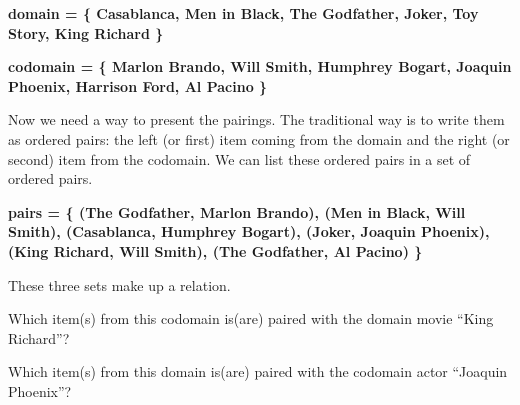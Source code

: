 \documentclass{ximera}
\begin{document}
\begin{center} 
\textbf{\textcolor{blue!75!black}{ domain = \{ Casablanca, Men in Black,  The Godfather, Joker, Toy Story, King Richard \} }}
\end{center}

\begin{center} 
\textbf{\textcolor{blue!75!black}{ codomain = \{ Marlon Brando, Will Smith, Humphrey Bogart, Joaquin Phoenix, Harrison Ford, Al Pacino \} }}
\end{center}

Now we need a way to present the pairings.  The traditional way is to write them as ordered pairs: the left (or first) item coming from the domain and the right (or second) item from the codomain.  We can list these ordered pairs in a set of ordered pairs. 

\begin{center} 
\textbf{\textcolor{blue!75!black}{ pairs = \{ (The Godfather, Marlon Brando), (Men in Black, Will Smith), (Casablanca, Humphrey Bogart), (Joker, Joaquin Phoenix), (King Richard, Will Smith), (The Godfather, Al Pacino) \}  }}
\end{center}


These three sets make up a relation. 



\begin{question}

Which item(s) from this codomain is(are) paired with the domain movie ``King Richard''?
\begin{selectAll}
\end{selectAll}

\end{question}



\begin{question}

Which item(s) from this domain is(are) paired with the codomain actor ``Joaquin Phoenix''?
\begin{selectAll}
\end{selectAll}

\end{question}
\end{document}
